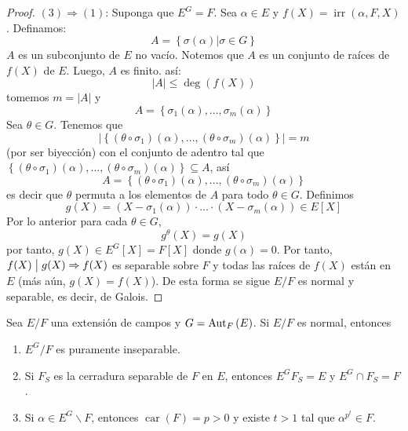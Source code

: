 \documentclass[12pt]{report}
\theoremstyle{largebreak}
\newcommand\divides{\ensuremath{\bigm|}}
\DeclareMathOperator{\car}{car}
\DeclareMathOperator{\irr}{irr}
\begin{document}
\begin{proof}
        $(3)\Rightarrow(1)$: Suponga que $E^G=F$. Sea $\alpha\in E$ y $f(X)=\irr(\alpha,F,X)$. Definamos:
        \begin{equation*}
            A=\left\{\sigma(\alpha)\Big|\sigma\in G \right\}
        \end{equation*}
        $A$ es un subconjunto de $E$ no vacío. Notemos que $A$ es un conjunto de raíces de $f(X)$ de $E$. Luego, $A$ es finito. así:
        \begin{equation*}
            |A|\leq\deg(f(X))
        \end{equation*}
        tomemos $m=|A|$ y
        \begin{equation*}
            A=\left\{\sigma_1(\alpha),...,\sigma_m(\alpha) \right\}
        \end{equation*}
        Sea $\theta\in G$. Tenemos que
        \begin{equation*}
            |\left\{(\theta\circ\sigma_1)(\alpha),...,(\theta\circ\sigma_m)(\alpha) \right\}|=m
        \end{equation*}
        (por ser biyección) con el conjunto de adentro tal que $\left\{(\theta\circ\sigma_1)(\alpha),...,(\theta\circ\sigma_m)(\alpha)\right\}\subseteq A$, así
        \begin{equation*}
            A=\left\{(\theta\circ\sigma_1)(\alpha),...,(\theta\circ\sigma_m)(\alpha)\right\}
        \end{equation*}
        es decir que $\theta$ permuta a los elementos de $A$ para todo $\theta\in G$. Definimos
        \begin{equation*}
            g(X)=(X-\sigma_1(\alpha))\cdot...\cdot(X-\sigma_m(\alpha))\in E[X]
        \end{equation*}
        Por lo anterior para cada $\theta\in G$,
        \begin{equation*}
            g^\theta(X)=g(X)
        \end{equation*}
        por tanto, $g(X)\in E^{G}[X]=F[X]$ donde $g(\alpha)=0$. Por tanto, $f(X)\divides g(X)\Rightarrow f(X)$ es separable sobre $F$ y todas las raíces de $f(X)$ están en $E$ (más aún, $g(X)=f(X)$). De esta forma se sigue $E/F$ es normal y separable, es decir, de Galois.
    \end{proof}

    \begin{propo}
        Sea $E/F$ una extensión de campos y $G=\textup{Aut}_{F}\left(E\right)$. Si $E/F$ es normal, entonces
        \begin{enumerate}
            \item $E^G/F$ es puramente inseparable.
            \item Si $F_S$ es la cerradura separable de $F$ en $E$, entonces $E^G F_S=E$ y $E^G\cap F_S=F$.
            \item Si $\alpha\in E^G\backslash F$, entonces $\car(F)=p>0$ y existe $t>1$ tal que $\alpha^{p^t}\in F$.
        \end{enumerate}
    \end{propo}
\end{document}
